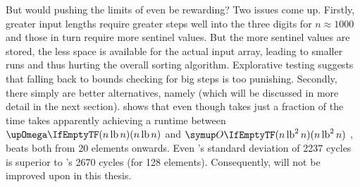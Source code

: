 But would pushing the limits of \ShS{} even be rewarding?
Two issues come up.
Firstly, greater input lengths require greater steps \Dash well into the three digits for \(n \approx 1000\) \cite{skean2023optimization, 10.1007/3-540-44669-9_12} \Dash and those in turn require more sentinel values.
But the more sentinel values are stored, the less space is available for the actual input array, leading to smaller runs and thus hurting the overall sorting algorithm.
Explorative testing suggests that falling back to bounds checking for big steps is too punishing.
Secondly, there simply are better alternatives, namely \QS{} (which will be discussed in more detail in the next section).
 shows that even though \ShS{} takes just a fraction of the time \IS{} takes \Dash apparently achieving a runtime between \(\bigomega{n \lb n}\) and \(\bigoh{n \lb^2 n}\) \Dash\negthinspace, \QS{} beats both from 20 elements onwards.
Even \QS{}'s standard deviation of 2237 cycles is superior to \ShS{}'s 2670 cycles (for 128 elements).
Consequently, \ShS{} will not be improved upon in this thesis.
